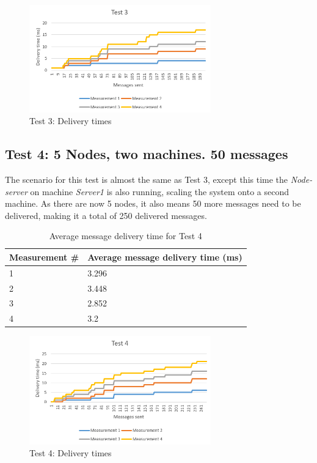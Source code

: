 \begin{figure}[!ht]
	\centering
	\includegraphics[width=0.7\textwidth]{figures/05_testing/test-perf3}
    \caption{Test 3: Delivery times}
    \label{fig:test-perf3}
\end{figure}

\subsection{Test 4: 5 Nodes, two machines. 50 messages}
The scenario for this test is almost the same as Test 3, except this time the \textit{Node-server} on machine \textit{Server1} is also running, scaling the system onto a second machine. As there are now 5 nodes, it also means 50 more messages need to be delivered, making it a total of 250 delivered messages.

\begin{table}[!ht]
\begin{center}
\begin{tabularx}{0.7\textwidth}{l|l}
\hline
\textbf{Measurement \#} & \textbf{Average message delivery time (ms)} \\
\hline
1 & 3.296\\
\hline
2 & 3.448\\
\hline
3 & 2.852\\
\hline
4 & 3.2\\
\hline
\end{tabularx}
\end{center}
\caption{Average message delivery time for Test 4}
\label{tab:test-perf4}
\end{table}

\begin{figure}[!ht]
	\centering
	\includegraphics[width=0.7\textwidth]{figures/05_testing/test-perf4}
    \caption{Test 4: Delivery times}
    \label{fig:test-perf4}
\end{figure}

